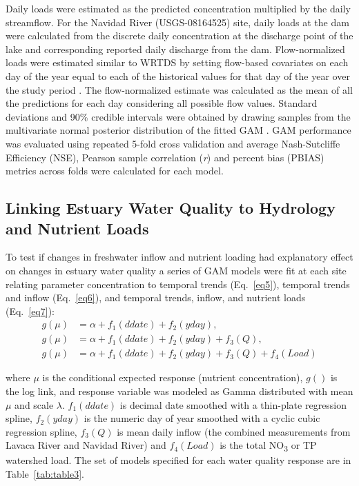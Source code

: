 \documentclass[sn-basic,referee,lineno,pdflatex]{sn-jnl}
\begin{document}
Daily loads were estimated as the predicted concentration multiplied by
the daily streamflow. For the Navidad River (USGS-08164525) site, daily
loads at the dam were calculated from the discrete daily concentration
at the discharge point of the lake and corresponding reported daily
discharge from the dam. Flow-normalized loads were estimated similar to
WRTDS by setting flow-based covariates on each day of the year equal to
each of the historical values for that day of the year over the study
period \citep{hirschWeightedRegressionsTime2010}. The flow-normalized
estimate was calculated as the mean of all the predictions for each day
considering all possible flow values. Standard deviations and 90\%
credible intervals were obtained by drawing samples from the
multivariate normal posterior distribution of the fitted GAM
\citep{woodConfidenceIntervalsGeneralized2006, marraCoveragePropertiesConfidence2012, mcdowell_implications_2021}.
GAM performance was evaluated using repeated 5-fold cross validation
\citep{burmanComparativeStudyOrdinary1989} and average Nash-Sutcliffe
Efficiency (NSE), Pearson sample correlation (\emph{r}) and percent bias
(PBIAS) metrics across folds were calculated for each model.

\hypertarget{linking-estuary-water-quality-to-hydrology-and-nutrient-loads}{%
\subsection{Linking Estuary Water Quality to Hydrology and Nutrient
Loads}\label{linking-estuary-water-quality-to-hydrology-and-nutrient-loads}}

To test if changes in freshwater inflow and nutrient loading had
explanatory effect on changes in estuary water quality a series of GAM
models were fit at each site relating parameter concentration to
temporal trends (Eq.~\ref{eq5}), temporal trends and inflow
(Eq.~\ref{eq6}), and temporal trends, inflow, and nutrient loads
(Eq.~\ref{eq7}): \begin{align}
g(\mu) &= \alpha + f_1(ddate) + f_2(yday), \label{eq5} \\
g(\mu) &= \alpha + f_1(ddate) + f_2(yday) + f_3(Q), \label{eq6} \\
g(\mu) &= \alpha + f_1(ddate) + f_2(yday) + f_3(Q) + f_4(Load) \label{eq7}
\end{align}

where \(\mu\) is the conditional expected response (nutrient
concentration), \(g()\) is the log link, and response variable was
modeled as Gamma distributed with mean \(\mu\) and scale \(\lambda\).
\(f_1(ddate)\) is decimal date smoothed with a thin-plate regression
spline, \(f_2(yday)\) is the numeric day of year smoothed with a cyclic
cubic regression spline, \(f_3(Q)\) is mean daily inflow (the combined
measurements from Lavaca River and Navidad River) and \(f_4(Load)\) is
the total NO\textsubscript{3} or TP watershed load. The set of models
specified for each water quality response are in Table~\ref{tab:table3}.
\end{document}
